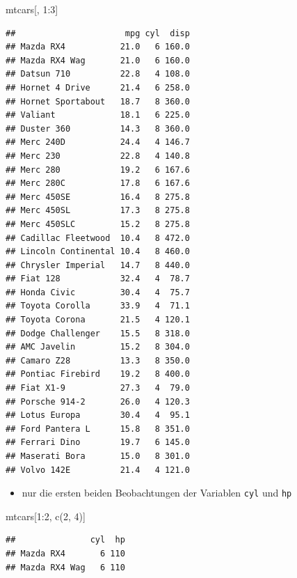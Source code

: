 \documentclass[12pt,a4paper]{article}
\newenvironment{Shaded}{\begin{snugshade}}{\end{snugshade}}
\newcommand{\DecValTok}[1]{\textcolor[rgb]{0.00,0.00,0.81}{#1}}
\newcommand{\FunctionTok}[1]{\textcolor[rgb]{0.00,0.00,0.00}{#1}}
\newcommand{\NormalTok}[1]{#1}
\newcommand{\SpecialCharTok}[1]{\textcolor[rgb]{0.00,0.00,0.00}{#1}}
\begin{document}
\begin{Shaded}
\begin{Highlighting}[]
\NormalTok{    mtcars[, }\DecValTok{1}\SpecialCharTok{:}\DecValTok{3}\NormalTok{]}
\end{Highlighting}
\end{Shaded}

\begin{verbatim}
##                      mpg cyl  disp
## Mazda RX4           21.0   6 160.0
## Mazda RX4 Wag       21.0   6 160.0
## Datsun 710          22.8   4 108.0
## Hornet 4 Drive      21.4   6 258.0
## Hornet Sportabout   18.7   8 360.0
## Valiant             18.1   6 225.0
## Duster 360          14.3   8 360.0
## Merc 240D           24.4   4 146.7
## Merc 230            22.8   4 140.8
## Merc 280            19.2   6 167.6
## Merc 280C           17.8   6 167.6
## Merc 450SE          16.4   8 275.8
## Merc 450SL          17.3   8 275.8
## Merc 450SLC         15.2   8 275.8
## Cadillac Fleetwood  10.4   8 472.0
## Lincoln Continental 10.4   8 460.0
## Chrysler Imperial   14.7   8 440.0
## Fiat 128            32.4   4  78.7
## Honda Civic         30.4   4  75.7
## Toyota Corolla      33.9   4  71.1
## Toyota Corona       21.5   4 120.1
## Dodge Challenger    15.5   8 318.0
## AMC Javelin         15.2   8 304.0
## Camaro Z28          13.3   8 350.0
## Pontiac Firebird    19.2   8 400.0
## Fiat X1-9           27.3   4  79.0
## Porsche 914-2       26.0   4 120.3
## Lotus Europa        30.4   4  95.1
## Ford Pantera L      15.8   8 351.0
## Ferrari Dino        19.7   6 145.0
## Maserati Bora       15.0   8 301.0
## Volvo 142E          21.4   4 121.0
\end{verbatim}

\begin{itemize}
  \item nur die ersten beiden Beobachtungen der Variablen \texttt{cyl} und \texttt{hp}
\end{itemize}

\begin{Shaded}
\begin{Highlighting}[]
\NormalTok{    mtcars[}\DecValTok{1}\SpecialCharTok{:}\DecValTok{2}\NormalTok{, }\FunctionTok{c}\NormalTok{(}\DecValTok{2}\NormalTok{, }\DecValTok{4}\NormalTok{)]}
\end{Highlighting}
\end{Shaded}

\begin{verbatim}
##               cyl  hp
## Mazda RX4       6 110
## Mazda RX4 Wag   6 110
\end{verbatim}
\end{document}
